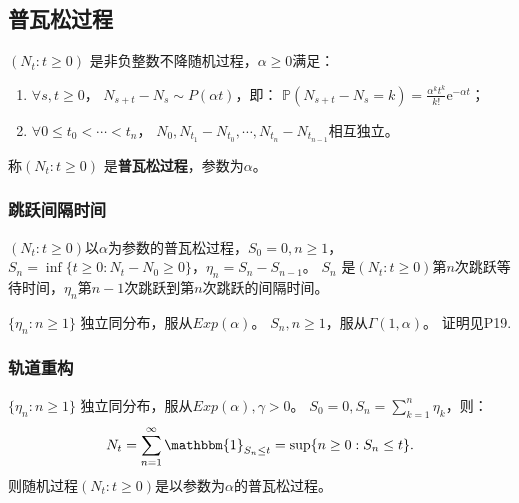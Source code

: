 \documentclass[main]{subfiles}
\begin{document}
\subsection{普瓦松过程}
\begin{definition}\label{def:Poisson Process}
  \((N_t: t \geq 0)\) 是非负整数不降随机过程，\(\alpha \geq 0\)满足：
  \begin{enumerate}
    \item \(\forall s,t \geq 0\)， \(N_{s + t}-N_s \sim P(\alpha t)\)，即：
      \(\mathbb{P}(N_{s + t}-N_s=k)=\frac{\alpha^kt^k}{k !}\mathrm{e}^{-\alpha t}\)；
    \item \(\forall 0 \leq t_0 < \cdots< t_n\)， \(N_0,N_{t_{1}}-N_{t_0},\cdots,N_{t_n}-N_{t_{n-1}}\)相互独立。
  \end{enumerate}
  称\((N_t:t \geq 0)\) 是\textbf{普瓦松过程}，参数为\(\alpha\)。
\end{definition}
\subsubsection{跳跃间隔时间}
\((N_t: t \geq 0)\)以\(\alpha\)为参数的普瓦松过程，\(S_0=0,n \geq 1\)， \(S_n=\inf \{t \geq 0: N_t-N_0 \geq 0\}\)，\(\eta_n=S_n-S_{n-1}\)。
\(S_n\) 是\((N_t : t \geq 0)\)第\(n\)次跳跃等待时间，\(\eta_n\)第\(n-1\)次跳跃到第\(n\)次跳跃的间隔时间。
\begin{theorem}\label{the:1.4.1}
  \(\{\eta_n:n \geq 1\}\) 独立同分布，服从\(Exp(\alpha)\)。
  \(S_n, n \geq 1\)，服从\(\Gamma(1,\alpha)\)。
  证明见P19.
\end{theorem}
\subsubsection{轨道重构}
\begin{theorem}\label{the:1.4.3}
  \(\{\eta_n:n \geq 1\}\) 独立同分布，服从\(Exp(\alpha),\gamma >0\)。
  \(S_0=0,S_n=\sum_{k=1}^{n} \eta_k\)，则：
  \[
    N_t=\sum_{n=1}^{\infty} \mathbbm{1}_{S_n \leq t}=\sup\{n \geq 0: S_n \leq t\}.
  \]
  则随机过程\((N_t:t \geq 0)\)是以参数为\(\alpha\)的普瓦松过程。
\end{theorem}
\end{document}
